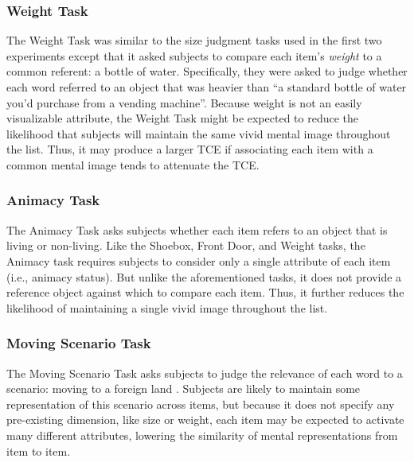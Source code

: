 \documentclass[jou,natbib,floatsintext]{apa6} %
\begin{document}
\subsubsection{Weight Task} The Weight Task was similar to the size judgment tasks used in the first two experiments except that it asked subjects to compare each item's \emph{weight} to a common referent: a bottle of water. Specifically, they were asked to judge whether each word referred to an object that was heavier than ``a standard bottle of water you'd purchase from a vending machine''. Because weight is not an easily visualizable attribute, the Weight Task might be expected to reduce the likelihood that subjects will maintain the same vivid mental image throughout the list. Thus, it may produce a larger TCE if associating each item with a common mental image tends to attenuate the TCE.

\subsubsection{Animacy Task} The Animacy Task asks subjects whether each item refers to an object that is living or non-living. Like the Shoebox, Front Door, and Weight tasks, the Animacy task requires subjects to consider only a single attribute of each item (i.e., animacy status). But unlike the aforementioned tasks, it does not provide a reference object against which to compare each item. Thus, it further reduces the likelihood of maintaining a single vivid image throughout the list. 

\subsubsection{Moving Scenario Task} The Moving Scenario Task asks subjects to judge the relevance of each word to a scenario: moving to a foreign land \citep{NairEtal17}. Subjects are likely to maintain some representation of this scenario across items, but because it does not specify any pre-existing dimension, like size or weight, each item may be expected to activate many different attributes, lowering the similarity of mental representations from item to item.
\end{document}
